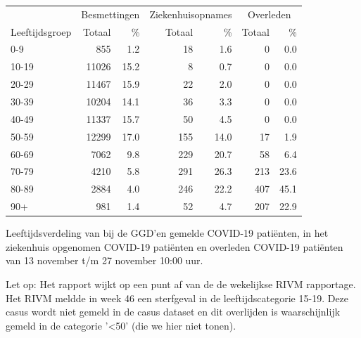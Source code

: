 \documentclass[
  english,
  man,floatsintext]{apa6}
\begin{document}
\begin{table}[H]
\centering\begingroup\fontsize{11}{13}\selectfont

\begin{threeparttable}
\begin{tabular}{lrrrrrr}
\toprule
\multicolumn{1}{c}{ } & \multicolumn{2}{c}{Besmettingen} & \multicolumn{2}{c}{Ziekenhuisopnames} & \multicolumn{2}{c}{Overleden} \\
\cmidrule(l{3pt}r{3pt}){2-3} \cmidrule(l{3pt}r{3pt}){4-5} \cmidrule(l{3pt}r{3pt}){6-7}
Leeftijdsgroep & Totaal & \% & Totaal & \% & Totaal & \%\\
\midrule
0-9 & 855 & 1.2 & 18 & 1.6 & 0 & 0.0\\
10-19 & 11026 & 15.2 & 8 & 0.7 & 0 & 0.0\\
20-29 & 11467 & 15.9 & 22 & 2.0 & 0 & 0.0\\
30-39 & 10204 & 14.1 & 36 & 3.3 & 0 & 0.0\\
40-49 & 11337 & 15.7 & 50 & 4.5 & 0 & 0.0\\
50-59 & 12299 & 17.0 & 155 & 14.0 & 17 & 1.9\\
60-69 & 7062 & 9.8 & 229 & 20.7 & 58 & 6.4\\
70-79 & 4210 & 5.8 & 291 & 26.3 & 213 & 23.6\\
80-89 & 2884 & 4.0 & 246 & 22.2 & 407 & 45.1\\
90+ & 981 & 1.4 & 52 & 4.7 & 207 & 22.9\\
\bottomrule
\end{tabular}
\begin{tablenotes}
\item[1] Leeftijdsverdeling van bij de GGD’en gemelde COVID-19 patiënten, in het ziekenhuis opgenomen COVID-19 patiënten en overleden COVID-19 patiënten van 13 november t/m 27 november 10:00 uur.
\item[2] Let op: Het rapport wijkt op een punt af van de de wekelijkse RIVM rapportage. Het RIVM meldde in week 46 een sterfgeval in de leeftijdscategorie 15-19. Deze casus wordt niet gemeld in de casus dataset en dit overlijden is waarschijnlijk gemeld in de categorie '<50' (die we hier niet tonen).
\end{tablenotes}
\end{threeparttable}
\endgroup{}
\end{table}

\newpage
\end{document}

